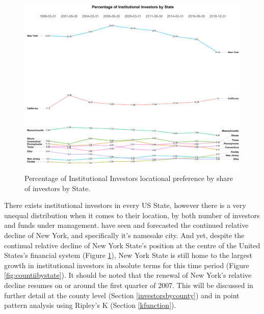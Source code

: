 \begin{figure}[h]
	\centering
	\includegraphics[width=\linewidth]{Figures/ChapterIII/Precentage_State}
	\caption[Percentage of Investor by State]{Percentage of Institutional Investors locational preference by share of investors by State.}
	\label{fig:precentagestate}
\end{figure}
There exists institutional investors in every US State, however there is a very unequal distribution when it comes to their location, by both number of investors and funds under management. \cite{WheelerMitchelson89,Green1995,bodenmanfirm2000, Graves2003} have seen and forecasted the continued relative decline of New York, and specifically it's namesake city.  And yet, despite the continual relative decline of New York State's position at the centre of the United States's financial system (Figure \ref{fig:precentagestate}), New York State is still home to the largest growth in institutional investors in absolute terms for this time period (Figure \ref{fig:countiibystate}). It should be noted that the renewal of New York's relative decline resumes on or around the first quarter of 2007.  This will be discussed in further detail at the county level (Section \ref{investorsbycounty}) and in point pattern analysis using Ripley's K (Section \ref{kfunction}).  	

